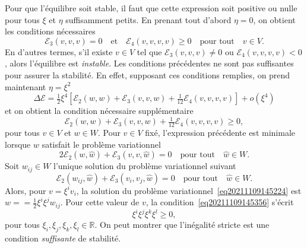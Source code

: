 \documentclass{article}
\newcommand{\nocomma}{}
\newcommand{\tmem}[1]{{\em #1\/}}
\begin{document}
Pour que l'{\'e}quilibre soit stable, il faut que cette expression soit
positive ou nulle pour tous $\xi$ et $\eta$ suffisamment petits. En prenant
tout d'abord $\eta = 0$, on obtient les conditions n{\'e}cessaires
\begin{equation}
  \label{eq20211108164416} \mathcal{E}_3 (v, v, v) = 0 \quad \text{et} \quad
  \mathcal{E}_4 (v, v, v, v) \geq 0 \quad \text{pour tout} \quad v \in V.
\end{equation}
En d'autres termes, s'il existe $v \in V$ tel que $\mathcal{E}_3 (v, v, v)
\neq 0$ ou $\mathcal{E}_4 (v, v, v, v) < 0$, alors l'{\'e}quilibre est
{\tmem{instable}}. Les conditions pr{\'e}c{\'e}dentes ne sont pas suffisantes
pour assurer la stabilit{\'e}. En effet, supposant ces conditions remplies, on
prend maintenant $\eta = \xi^2$
\begin{equation}
  \Delta \mathcal{E}= \tfrac{1}{2} \xi^4  \left[ \mathcal{E}_2 (w, w)
  +\mathcal{E}_3 (v, v, w) + \tfrac{1}{12} \mathcal{E}_4 (v, v, v, v) \right]
  + o (\xi^4)
\end{equation}
et on obtient la condition n{\'e}cessaire suppl{\'e}mentaire
\begin{equation}
  \label{eq20211109145356} \mathcal{E}_2 (w, w) +\mathcal{E}_3 (v, v, w) +
  \tfrac{1}{12} \mathcal{E}_4 (v, v, v, v) \geq 0,
\end{equation}
pour tous $v \in V$ et $w \in W$. Pour $v \in V$ fix{\'e}, l'expression
pr{\'e}c{\'e}dente est minimale lorsque $w$ satisfait le probl{\`e}me
variationnel
\begin{equation}
  \label{eq20211109145224} 2\mathcal{E}_2 (w, \hat{w}) +\mathcal{E}_3 (v, v,
  \hat{w}) = 0 \quad \text{pour tout} \quad \hat{w} \in W.
\end{equation}
Soit $w_{i \nocomma j} \in W$ l'unique solution du probl{\`e}me variationnel
suivant
\begin{equation}
  \label{eq:pbvar wij} \mathcal{E}_2 (w_{i \nocomma j}, \hat{w})
  +\mathcal{E}_3 (v_i, v_j, \hat{w}) = 0 \quad \text{pour tout} \quad \hat{w}
  \in W.
\end{equation}
Alors, pour $v = \xi^i v_i$, la solution du probl{\`e}me
variationnel~\eqref{eq20211109145224} est $w = = \tfrac{1}{2} \xi^i \xi^j w_{i
\nocomma j}$. Pour cette valeur de $v$, la condition~\eqref{eq20211109145356}
s'{\'e}crit
\begin{equation}
  [\mathcal{E}_4 (v_i, v_j, v_k, v_l) - 3\mathcal{E}_2 (w_{i \nocomma j}, w_{k
  \nocomma l})] \xi^i \xi^j \xi^k \xi^l \geq 0,
\end{equation}
pour tous $\xi_i, \xi_j, \xi_k, \xi_l \in \mathbb{R}$. On peut montrer que
l'in{\'e}galit{\'e} stricte est une condition {\tmem{suffisante}} de
stabilit{\'e}.
\end{document}
